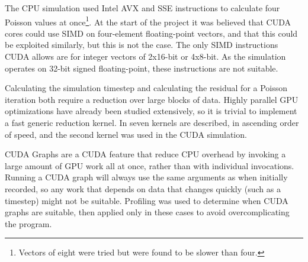 The CPU simulation used Intel AVX and SSE instructions\cite{IntelCorporationIntroductionExtensions} to calculate four Poisson values at once\footnote{Vectors of eight were tried but were found to be slower than four.}.
At the start of the project it was believed that CUDA cores could use SIMD on four-element floating-point vectors, and that this could be exploited similarly, but this is not the case.
The only SIMD instructions CUDA allows are for integer vectors of 2x16-bit or 4x8-bit\cite{NvidiaCUDASIMD}.
As the simulation operates on 32-bit signed floating-point, these instructions are not suitable.


Calculating the simulation timestep and calculating the residual for a Poisson iteration both require a reduction over large blocks of data.
Highly parallel GPU optimizations have already been studied extensively, so it is trivial to implement a fast generic reduction kernel.
In \cite{CUDAParallelReduction} seven kernels are described, in ascending order of speed, and the second kernel was used in the CUDA simulation.

CUDA Graphs\cite{GrayCUDAGraph2019Blog} are a CUDA feature that reduce CPU overhead by invoking a large amount of GPU work all at once, rather than with individual invocations.
Running a CUDA graph will always use the same arguments as when initially recorded, so any work that depends on data that changes quickly (such as a timestep) might not be suitable.
Profiling was used to determine when CUDA graphs are suitable, then applied only in these cases to avoid overcomplicating the program.